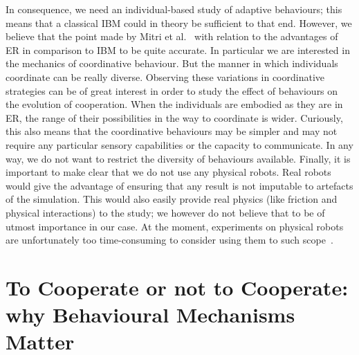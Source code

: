     In consequence, we need an individual-based study of adaptive behaviours; this means that a classical IBM could in theory be sufficient to that end. However, we believe that the point made by Mitri et al.~\cite{Mitri2012} with relation to the advantages of ER in comparison to IBM to be quite accurate. In particular we are interested in the mechanics of coordinative behaviour. But the manner in which individuals coordinate can be really diverse. Observing these variations in coordinative strategies can be of great interest in order to study the effect of behaviours on the evolution of cooperation. When the individuals are embodied as they are in ER, the range of their possibilities in the way to coordinate is wider. Curiously, this also means that the coordinative behaviours may be simpler and may not require any particular sensory capabilities or the capacity to communicate. In any way, we do not want to restrict the diversity of behaviours available. Finally, it is important to make clear that we do not use any physical robots. Real robots would give the advantage of ensuring that any result is not imputable to artefacts of the simulation. This would also easily provide real physics (like friction and physical interactions) to the study; we however do not believe that to be of utmost importance in our case. At the moment, experiments on physical robots are unfortunately too time-consuming to consider using them to such scope~\cite{Mitri2012, Doncieux2015}.








































\section{To Cooperate or not to Cooperate: why Behavioural Mechanisms Matter}
